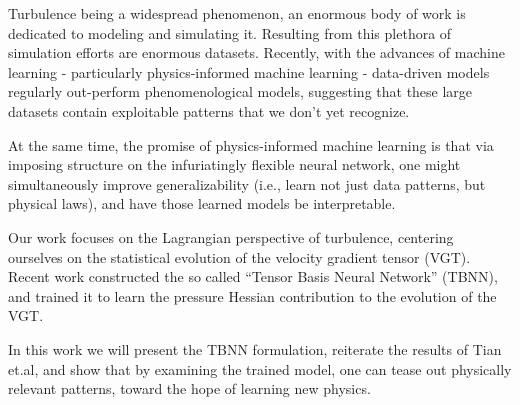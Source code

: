 Turbulence being a widespread phenomenon, an enormous body of work is dedicated to modeling and simulating it. Resulting from this plethora of simulation efforts are enormous datasets. Recently, with the advances of machine learning - particularly physics-informed machine learning - data-driven models regularly out-perform phenomenological models, suggesting that these large datasets contain exploitable patterns that we don't yet recognize.

At the same time, the promise of physics-informed machine learning is that via imposing structure on the infuriatingly flexible neural network, one might simultaneously improve generalizability (i.e., learn not just data patterns, but physical laws), and have those learned models be interpretable.

Our work focuses on the Lagrangian perspective of turbulence, centering ourselves on the statistical evolution of the velocity gradient tensor (VGT). Recent work \cite{tian2021} constructed the so called ``Tensor Basis Neural Network'' (TBNN), and trained it to learn the pressure Hessian contribution to the evolution of the VGT.

In this work we will present the TBNN formulation, reiterate the results of Tian et.al, and show that by examining the trained model, one can tease out physically relevant patterns, toward the hope of learning new physics.
